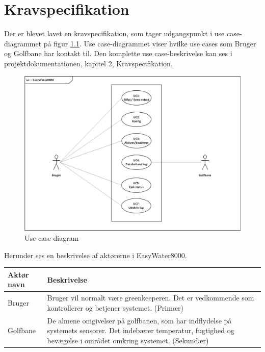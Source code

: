 \chapter{Kravspecifikation}

Der er blevet lavet en kravspecifikation, som tager udgangspunkt i use case-diagrammet på figur \ref{lab:usecasediagram}. Use case-diagrammet viser hvilke use cases som Bruger og Golfbane har kontakt til. Den komplette use case-beskrivelse kan ses i projektdokumentationen, kapitel 2, Kravspecifikation. 

\begin{figure}[H] \centering
\vspace*{\fill}
\includegraphics[width=\textwidth]{Billeder/Usecase_Diagram}
\caption{Use case diagram}
\label{lab:usecasediagram}
\vspace*{\fill}
\end{figure}

Herunder ses en beskrivelse af aktørerne i EasyWater8000.

\begin{table}[!htbp] \centering
	\begin{tabular}{|p{2.5cm}|p{11.5cm}|}
	\hline
		\textbf{Aktør navn} & \textbf{Beskrivelse} \\\hline
		Bruger & Bruger vil normalt være greenkeeperen. Det er vedkommende som kontrollerer og betjener systemet. (Primær) \\\hline

		Golfbane & De almene omgivelser på golfbanen, som har indflydelse på systemets sensorer. Det indebærer temperatur, fugtighed og bevægelse i området omkring systemet. (Sekundær) \\\hline
	\end{tabular}
\end{table}

